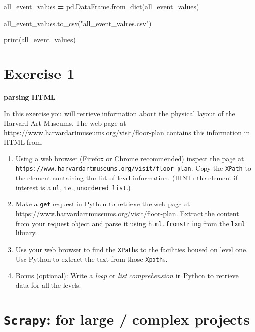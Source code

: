 \documentclass[]{book}
\newenvironment{Shaded}{\begin{snugshade}}{\end{snugshade}}
\newcommand{\StringTok}[1]{\textcolor[rgb]{0.31,0.60,0.02}{#1}}
\newcommand{\OperatorTok}[1]{\textcolor[rgb]{0.81,0.36,0.00}{\textbf{#1}}}
\newcommand{\BuiltInTok}[1]{#1}
\newcommand{\NormalTok}[1]{#1}
\providecommand{\tightlist}{%
  \setlength{\itemsep}{0pt}\setlength{\parskip}{0pt}}
\begin{document}
\begin{Shaded}
\begin{Highlighting}[]
\NormalTok{all_event_values }\OperatorTok{=}\NormalTok{ pd.DataFrame.from_dict(all_event_values)}

\NormalTok{all_event_values.to_csv(}\StringTok{"all_event_values.csv"}\NormalTok{)}

\BuiltInTok{print}\NormalTok{(all_event_values)}
\end{Highlighting}
\end{Shaded}

\section{Exercise 1}\label{exercise-1-5}

\textbf{parsing HTML}

In this exercise you will retrieve information about the physical layout
of the Harvard Art Museums. The web page at
\url{https://www.harvardartmuseums.org/visit/floor-plan} contains this
information in HTML from.

\begin{enumerate}
\def\labelenumi{\arabic{enumi}.}
\tightlist
\item
  Using a web browser (Firefox or Chrome recommended) inspect the page
  at \texttt{https://www.harvardartmuseums.org/visit/floor-plan}. Copy
  the \texttt{XPath} to the element containing the list of level
  information. (HINT: the element if interest is a \texttt{ul}, i.e.,
  \texttt{unordered\ list}.)
\item
  Make a \texttt{get} request in Python to retrieve the web page at
  \url{https://www.harvardartmuseums.org/visit/floor-plan}. Extract the
  content from your request object and parse it using
  \texttt{html.fromstring} from the \texttt{lxml} library.
\item
  Use your web browser to find the \texttt{XPath}s to the facilities
  housed on level one. Use Python to extract the text from those
  \texttt{Xpath}s.
\item
  Bonus (optional): Write a \emph{loop} or \emph{list comprehension} in
  Python to retrieve data for all the levels.
\end{enumerate}

\section{\texorpdfstring{\texttt{Scrapy}: for large / complex
projects}{Scrapy: for large / complex projects}}\label{scrapy-for-large-complex-projects}
\end{document}

